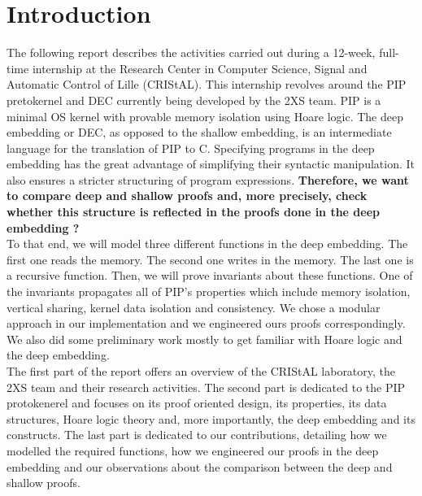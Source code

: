 \chapter{Introduction}
The following report describes the activities carried out during a 12-week, full-time internship at the Research Center in Computer Science, Signal and Automatic Control of Lille (CRIStAL). This internship revolves around the PIP pretokernel and DEC currently being developed by the 2XS team. PIP is a minimal OS kernel with provable memory isolation using Hoare logic. The deep embedding or DEC, as opposed to the shallow embedding, is an intermediate language for the translation of PIP to C. Specifying programs in the deep embedding has the great advantage of simplifying their syntactic manipulation. It also ensures a stricter structuring of program expressions. \textbf{Therefore, we want to compare deep and shallow proofs and, more precisely, check whether this structure is reflected in the proofs done in the deep embedding ?}\\ 

To that end, we will model three different functions in the deep embedding. The first one reads the memory. The second one writes in the memory. The last one is a recursive function. Then, we will prove invariants about these functions. One of the invariants propagates all of PIP's properties which include memory isolation, vertical sharing, kernel data isolation and consistency. We chose a modular approach in our implementation and we engineered ours proofs correspondingly. We also did some preliminary work mostly to get familiar with Hoare logic and the deep embedding. \\

The first part of the report offers an overview of the CRIStAL laboratory, the 2XS team and their research activities. The second part is dedicated to the PIP protokenerel and focuses on its proof oriented design, its properties, its data structures, Hoare logic theory and, more importantly, the deep embedding and its constructs. The last part is dedicated to our contributions, detailing how we modelled the required functions, how we engineered our proofs in the deep embedding and our observations about the comparison between the deep and shallow proofs.



